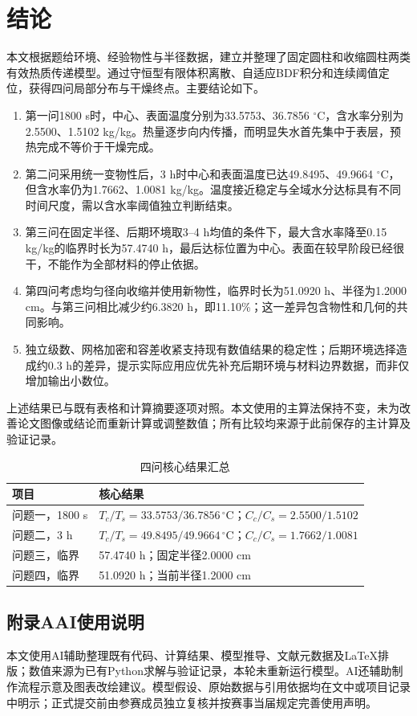 \section{结论}
本文根据题给环境、经验物性与半径数据，建立并整理了固定圆柱和收缩圆柱两类有效热质传递模型。通过守恒型有限体积离散、自适应BDF积分和连续阈值定位，获得四问局部分布与干燥终点。主要结论如下。

\begin{enumerate}
\item 第一问1800 s时，中心、表面温度分别为33.5753、36.7856 $^\circ$C，含水率分别为2.5500、1.5102 kg/kg。热量逐步向内传播，而明显失水首先集中于表层，预热完成不等价于干燥完成。
\item 第二问采用统一变物性后，3 h时中心和表面温度已达49.8495、49.9664 $^\circ$C，但含水率仍为1.7662、1.0081 kg/kg。温度接近稳定与全域水分达标具有不同时间尺度，需以含水率阈值独立判断结束。
\item 第三问在固定半径、后期环境取3--4 h均值的条件下，最大含水率降至0.15 kg/kg的临界时长为57.4740 h，最后达标位置为中心。表面在较早阶段已经很干，不能作为全部材料的停止依据。
\item 第四问考虑均匀径向收缩并使用新物性，临界时长为51.0920 h、半径为1.2000 cm。与第三问相比减少约6.3820 h，即11.10\%；这一差异包含物性和几何的共同影响。
\item 独立级数、网格加密和容差收紧支持现有数值结果的稳定性；后期环境选择造成约0.3 h的差异，提示实际应用应优先补充后期环境与材料边界数据，而非仅增加输出小数位。
\end{enumerate}

上述结果已与既有表格和计算摘要逐项对照。本文使用的主算法保持不变，未为改善论文图像或结论而重新计算或调整数值；所有比较均来源于此前保存的主计算及验证记录。

\begin{table}[H]\centering
\caption{四问核心结果汇总}\label{tab:final}
\begin{tabularx}{\linewidth}{lX}
\toprule 项目 & 核心结果\\\midrule
问题一，1800 s & $T_c/T_s=33.5753/36.7856\,^\circ$C；$C_c/C_s=2.5500/1.5102$\\
问题二，3 h & $T_c/T_s=49.8495/49.9664\,^\circ$C；$C_c/C_s=1.7662/1.0081$\\
问题三，临界 & 57.4740 h；固定半径2.0000 cm\\
问题四，临界 & 51.0920 h；当前半径1.2000 cm\\
\bottomrule
\end{tabularx}
\end{table}

\subsection*{附录A\quad AI使用说明}
本文使用AI辅助整理既有代码、计算结果、模型推导、文献元数据及LaTeX排版；数值来源为已有Python求解与验证记录，本轮未重新运行模型。AI还辅助制作流程示意及图表改绘建议。模型假设、原始数据与引用依据均在文中或项目记录中明示；正式提交前由参赛成员独立复核并按赛事当届规定完善使用声明。
